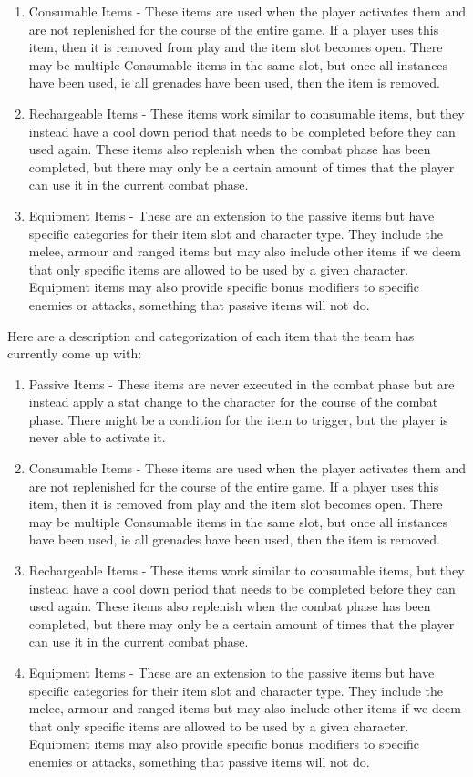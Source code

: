 \documentclass[12pt, titlepage]{article}
\begin{document}
\begin{enumerate}
\begin{enumerate}
	\item Consumable Items - These items are used when the player activates them and are not replenished for the course of the entire game. If a player uses this item, then it is removed from play and the item slot becomes open. There may be multiple Consumable items in the same slot, but once all instances have been used, ie all grenades have been used, then the item is removed.
	\item Rechargeable Items - These items work similar to consumable items, but they instead have a cool down period that needs to be completed before they can used again. These items also replenish when the combat phase has been completed, but there may only be a certain amount of times that the player can use it in the current combat phase.
	\item Equipment Items - These are an extension to the passive items but have specific categories for their item slot and character type. They include the melee, armour and ranged items but may also include other items if we deem that only specific items are allowed to be used by a given character. Equipment items may also provide specific bonus modifiers to specific enemies or attacks, something that passive items will not do.
	\end{enumerate}
	Here are a description and categorization of each item that the team has currently come up with:
	\begin{enumerate}
	\item Passive Items - These items are never executed in the combat phase but are instead apply a stat change to the character for the course of the combat phase. There might be a condition for the item to trigger, but the player is never able to activate it.
	\item Consumable Items - These items are used when the player activates them and are not replenished for the course of the entire game. If a player uses this item, then it is removed from play and the item slot becomes open. There may be multiple Consumable items in the same slot, but once all instances have been used, ie all grenades have been used, then the item is removed.
	\item Rechargeable Items - These items work similar to consumable items, but they instead have a cool down period that needs to be completed before they can used again. These items also replenish when the combat phase has been completed, but there may only be a certain amount of times that the player can use it in the current combat phase.
	\item Equipment Items - These are an extension to the passive items but have specific categories for their item slot and character type. They include the melee, armour and ranged items but may also include other items if we deem that only specific items are allowed to be used by a given character. Equipment items may also provide specific bonus modifiers to specific enemies or attacks, something that passive items will not do.

\end{enumerate}
\end{enumerate}
\end{document}
